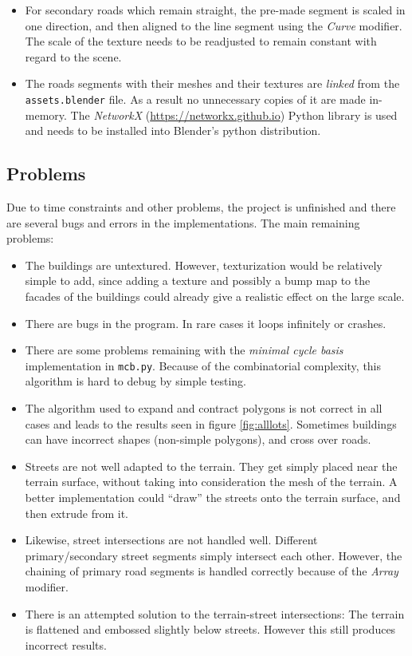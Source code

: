 \documentclass[a4paper,12pt]{scrartcl}
\begin{document}
\begin{itemize}
\item For secondary roads which remain straight, the pre-made segment is scaled in one direction, and then aligned to the line segment using the \emph{Curve} modifier. The scale of the texture needs to be readjusted to remain constant with regard to the scene.
\item The roads segments with their meshes and their textures are \emph{linked} from the \texttt{assets.blender} file. As a result no unnecessary copies of it are made in-memory.
\tem The \emph{NetworkX} (\url{https://networkx.github.io}) Python library is used and needs to be installed into Blender's python distribution.
\end{itemize}

\subsection{Problems}
Due to time constraints and other problems, the project is unfinished and there are several bugs and errors in the implementations. The main remaining problems:
\begin{itemize}
\item The buildings are untextured. However, texturization would be relatively simple to add, since adding a texture and possibly a bump map to the facades of the buildings could already give a realistic effect on the large scale.
\item There are bugs in the program. In rare cases it loops infinitely or crashes.
\item There are some problems remaining with the \emph{minimal cycle basis} implementation in \texttt{mcb.py}. Because of the combinatorial complexity, this algorithm is hard to debug by simple testing.
\item The algorithm used to expand and contract polygons is not correct in all cases and leads to the results seen in figure \ref{fig:alllots}. Sometimes buildings can have incorrect shapes (non-simple polygons), and cross over roads.
\item Streets are not well adapted to the terrain. They get simply placed near the terrain surface, without taking into consideration the mesh of the terrain. A better implementation could ``draw'' the streets onto the terrain surface, and then extrude from it.
\item Likewise, street intersections are not handled well. Different primary/secondary street segments simply intersect each other. However, the chaining of primary road segments is handled correctly because of the \emph{Array} modifier.
\item There is an attempted solution to the terrain-street intersections: The terrain is flattened and embossed slightly below streets. However this still produces incorrect results.
\end{itemize}
\end{document}
